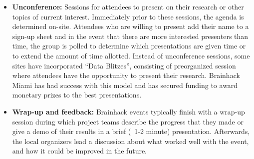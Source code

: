\begin{table}[!ht]
\begin{itemize}
    \item
        \textbf{Unconference:} Sessions for attendees to present on their research or other topics of current interest. Immediately prior to these sessions, the agenda is determined on-site. Attendees who are willing to present add their name to a sign-up sheet and in the event that there are more interested presenters than time, the group is polled to determine which presentations are given time or to extend the amount of time allotted. Instead of unconference sessions, some sites have incorporated ``Data Blitzes'', consisting of preorganized session where attendees have the opportunity to present their research. Brainhack Miami has had success with this model and has secured funding to award monetary prizes to the best presentations.
    \item
        \textbf{Wrap-up and feedback:} Brainhack events typically finish with a wrap-up session during which project teams describe the progress that they made or give a demo of their results in a brief (~1-2 minute) presentation. Afterwards, the local organizers lead a discussion about what worked well with the event, and how it could be improved in the future.
    \end{itemize}
\hline
\end{table}